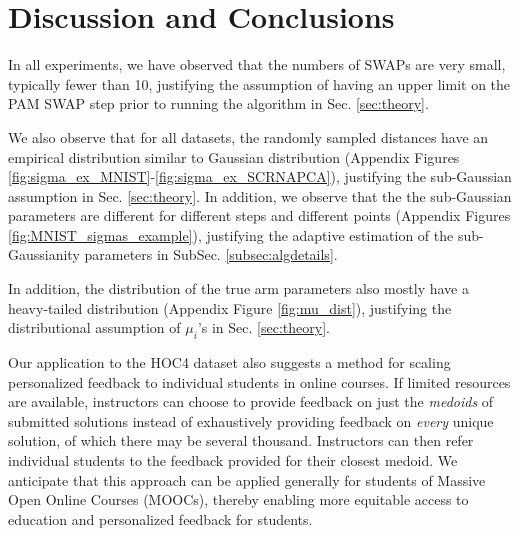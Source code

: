 
\section{Discussion and Conclusions}
\label{sec:discussion}

In all experiments, we have observed that the numbers of SWAPs are very small, typically fewer than 10, justifying the assumption of having an upper limit on the PAM SWAP step prior to running the algorithm in Sec. \ref{sec:theory}.   

We also observe that for all datasets, the randomly sampled distances have an empirical distribution similar to Gaussian distribution (Appendix Figures \ref{fig:sigma_ex_MNIST}-\ref{fig:sigma_ex_SCRNAPCA}), justifying the sub-Gaussian assumption in Sec. \ref{sec:theory}.
In addition, we observe that the the sub-Gaussian parameters are different for different steps and different points (Appendix Figures \ref{fig:MNIST_sigmas_example}), justifying the adaptive estimation of the sub-Gaussianity parameters in SubSec. \ref{subsec:algdetails}.

In addition, the distribution of the true arm parameters also mostly have a heavy-tailed distribution (Appendix Figure \ref{fig:mu_dist}), justifying the distributional assumption of $\mu_i$'s in Sec. \ref{sec:theory}. 




Our application to the HOC4 dataset also suggests a method for scaling personalized feedback to individual students in online courses. If limited resources are available, instructors can choose to provide feedback on just the \textit{medoids} of submitted solutions instead of exhaustively providing feedback on \textit{every} unique solution, of which there may be several thousand. Instructors can then refer individual students to the feedback provided for their closest medoid. We anticipate that this approach can be applied generally for students of Massive Open Online Courses (MOOCs), thereby enabling more equitable access to education and personalized feedback for students.